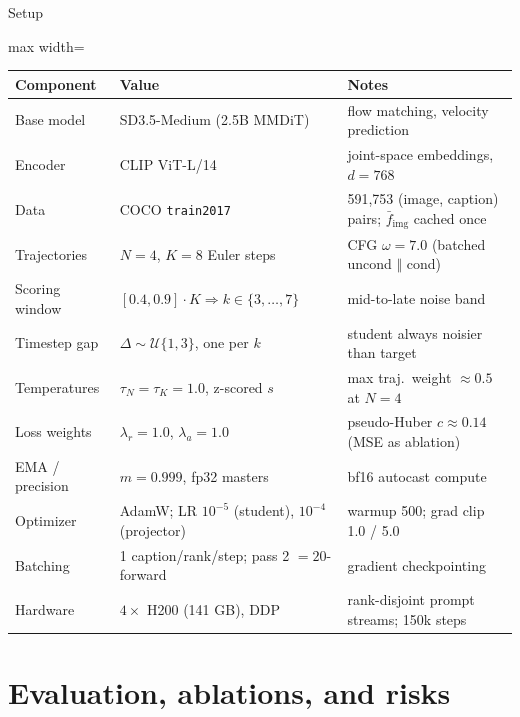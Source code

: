 \documentclass[aspectratio=169,10pt]{beamer}
\newcommand{\fimg}{\bar{f}_{\mathrm{img}}}
\begin{document}
\begin{frame}{Setup}
  \begin{center}
  \scriptsize
  \begin{adjustbox}{max width=\textwidth}
  \begin{tabular}{@{}lll@{}}
    \toprule
    \textbf{Component} & \textbf{Value} & \textbf{Notes} \\
    \midrule
    Base model & SD3.5-Medium (2.5B MMDiT) & flow matching, velocity prediction \\
    Encoder & CLIP ViT-L/14 & joint-space embeddings, $d = 768$ \\
    Data & COCO \texttt{train2017} & 591{,}753 (image, caption) pairs; $\fimg$ cached once \\
    Trajectories & $N = 4$, $K = 8$ Euler steps & CFG $\omega = 7.0$ (batched uncond $\Vert$ cond) \\
    Scoring window & $[0.4, 0.9] \cdot K \Rightarrow k \in \{3, \dots, 7\}$ & mid-to-late noise band \\
    Timestep gap & $\Delta \sim \mathcal{U}\{1, 3\}$, one per $k$ & student always noisier than target \\
    Temperatures & $\tau_N = \tau_K = 1.0$, z-scored $s$ & max traj.\ weight ${\approx}0.5$ at $N{=}4$ \\
    Loss weights & $\lambda_r = 1.0$, $\lambda_a = 1.0$ & pseudo-Huber $c \approx 0.14$ (MSE as ablation) \\
    EMA / precision & $m = 0.999$, fp32 masters & bf16 autocast compute \\
    Optimizer & AdamW; LR $10^{-5}$ (student), $10^{-4}$ (projector) & warmup 500; grad clip 1.0 / 5.0 \\
    Batching & 1 caption/rank/step; pass 2 $= 20$-forward & gradient checkpointing \\
    Hardware & $4 \times$ H200 (141 GB), DDP & rank-disjoint prompt streams; 150k steps \\
    \bottomrule
  \end{tabular}
  \end{adjustbox}
  \end{center}
\end{frame}

\section{Evaluation, ablations, and risks}
\end{document}

